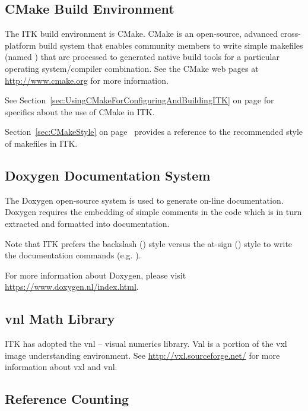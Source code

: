 \subsection{CMake Build Environment}
\label{subsec:CMakeBuildEnvironment}

The ITK build environment is CMake. CMake is an open-source, advanced
cross-platform build system that enables community members to write simple
makefiles (named ) that are processed to generated native
build tools for a particular operating system/compiler combination. See the
CMake web pages at \href{http://www.cmake.org}{http://www.cmake.org} for more
information.

See Section~\ref{sec:UsingCMakeForConfiguringAndBuildingITK} on page
\pageref{sec:UsingCMakeForConfiguringAndBuildingITK} for specifics about the use
of CMake in ITK.

Section~\ref{sec:CMakeStyle} on page~\pageref{sec:CMakeStyle} provides a
reference to the recommended style of makefiles in ITK.

\subsection{Doxygen Documentation System}
\label{subsec:DoxygenDocumentationSystem}

The Doxygen open-source system is used to generate on-line documentation.
Doxygen requires the embedding of simple comments in the code which is in turn
extracted and formatted into documentation.

Note that ITK prefers the backslash (\code{\textbackslash}) style versus the
at-sign () style to write the documentation commands (e.g.
).

For more information about Doxygen, please visit
\href{https://www.doxygen.nl/index.html}{https://www.doxygen.nl/index.html}.

\subsection{vnl Math Library}
\label{subsec:vnlMathLibrary}

ITK has adopted the vnl -- visual numerics library. Vnl is a portion of the vxl image
understanding environment. See \href{http://vxl.sourceforge.net/}{http://vxl.sourceforge.net/}
for more information about vxl and vnl.


\subsection{Reference Counting}
\label{subsec:ReferenceCounting}

